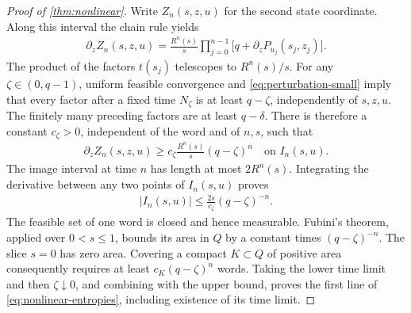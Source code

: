 \documentclass[11pt,a4paper]{article}
\theoremstyle{definition}
\theoremstyle{remark}
\begin{document}
\begin{proof}[Proof of \cref{thm:nonlinear}]
Write \(Z_n(s,z,u)\) for the second state coordinate. Along this interval the chain rule yields
\begin{align}\label{eq:vertical-derivative}
 \partial_z Z_n(s,z,u)
 =\frac{R^n(s)}s
   \prod_{j=0}^{n-1}
       \bigl[q+\partial_zP_{u_j}(s_j,z_j)\bigr].
\end{align}
The product of the factors \(t(s_j)\) telescopes to \(R^n(s)/s\).
For any \(\zeta\in(0,q-1)\), uniform feasible convergence and \eqref{eq:perturbation-small} imply that every factor after a fixed time \(N_\zeta\) is at least \(q-\zeta\), independently of \(s,z,u\). The finitely many preceding factors are at least \(q-\delta\). There is therefore a constant \(c_\zeta>0\), independent of the word and of \(n,s\), such that
\begin{align}
 \partial_z Z_n(s,z,u)
 \geq c_\zeta\frac{R^n(s)}s(q-\zeta)^n
 \quad\text{on }I_n(s,u).
\end{align}
The image interval at time \(n\) has length at most \(2R^n(s)\). Integrating the derivative between any two points of \(I_n(s,u)\) proves
\begin{align}\label{eq:exact-section-nonlinear}
 |I_n(s,u)|\leq \frac{2s}{c_\zeta}(q-\zeta)^{-n}.
\end{align}
The feasible set of one word is closed and hence measurable. Fubini's theorem, applied over \(0<s\leq1\), bounds its area in \(Q\) by a constant times \((q-\zeta)^{-n}\). The slice \(s=0\) has zero area. Covering a compact \(K\subset Q\) of positive area consequently requires at least \(c_K(q-\zeta)^n\) words. Taking the lower time limit and then \(\zeta\downarrow0\), and combining with the upper bound, proves the first line of \eqref{eq:nonlinear-entropies}, including existence of its time limit.


\end{proof}
\end{document}
